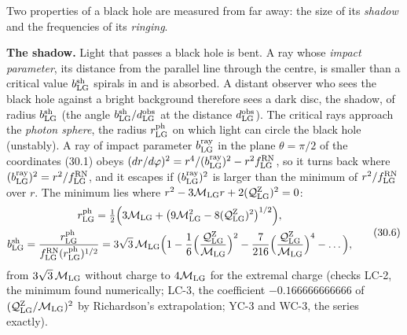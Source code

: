 \documentclass[
  10pt,
]{article}
\begin{document}
Two properties of a black hole are measured from far away: the size of
its \emph{shadow} and the frequencies of its \emph{ringing}.

\textbf{The shadow.} Light that passes a black hole is bent. A ray whose
\emph{impact parameter}, its distance from the parallel line through the
centre, is smaller than a critical value \(b^{\rm sh}_{\rm LG}\) spirals
in and is absorbed. A distant observer who sees the black hole against a
bright background therefore sees a dark disc, the shadow, of radius
\(b^{\rm sh}_{\rm LG}\) (the angle
\(b^{\rm sh}_{\rm LG}/d^{\rm obs}_{\rm LG}\) at the distance
\(d^{\rm obs}_{\rm LG}\)). The critical rays approach the \emph{photon
sphere}, the radius \(r^{\rm ph}_{\rm LG}\) on which light can circle
the black hole (unstably). A ray of impact parameter
\(b^{\rm ray}_{\rm LG}\) in the plane \(\theta=\pi/2\) of the
coordinates (30.1) obeys
\((dr/d\varphi)^2=r^4/(b^{\rm ray}_{\rm LG})^2-r^2f^{\rm RN}_{\rm LG}\),
so it turns back where
\((b^{\rm ray}_{\rm LG})^2=r^2/f^{\rm RN}_{\rm LG}\), and it escapes if
\((b^{\rm ray}_{\rm LG})^2\) is larger than the minimum of
\(r^2/f^{\rm RN}_{\rm LG}\) over \(r\). The minimum lies where
\(r^2-3\mathcal M_{\rm LG}r+2(\mathcal Q^{\rm Z}_{\rm LG})^2=0\):
\[\begin{gathered}r^{\rm ph}_{\rm LG}=\tfrac12\Big(3\mathcal M_{\rm LG}+\big(9\mathcal M_{\rm LG}^2-8(\mathcal Q^{\rm Z}_{\rm LG})^2\big)^{1/2}\Big),\\b^{\rm sh}_{\rm LG}=\frac{r^{\rm ph}_{\rm LG}}{f^{\rm RN}_{\rm LG}(r^{\rm ph}_{\rm LG})^{1/2}}=3\sqrt3\,\mathcal M_{\rm LG}\Big(1-\frac16\Big(\frac{\mathcal Q^{\rm Z}_{\rm LG}}{\mathcal M_{\rm LG}}\Big)^2-\frac7{216}\Big(\frac{\mathcal Q^{\rm Z}_{\rm LG}}{\mathcal M_{\rm LG}}\Big)^4-\dots\Big),\end{gathered}\tag{30.6}\]
from \(3\sqrt3\,\mathcal M_{\rm LG}\) without charge to
\(4\mathcal M_{\rm LG}\) for the extremal charge (checks LC-2, the
minimum found numerically; LC-3, the coefficient \(-0.166666666666\) of
\((\mathcal Q^{\rm Z}_{\rm LG}/\mathcal M_{\rm LG})^2\) by Richardson's
extrapolation; YC-3 and WC-3, the series exactly).
\end{document}
